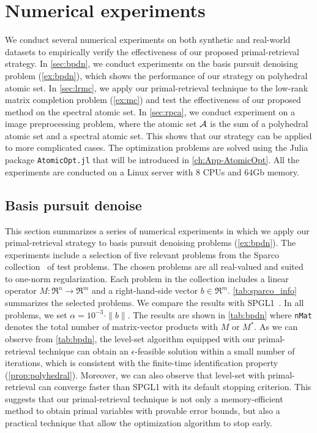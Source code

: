\section{Numerical experiments}

We conduct several numerical experiments on both synthetic and real-world datasets to empirically verify the effectiveness of our proposed primal-retrieval strategy. In \autoref{sec:bpdn}, we conduct experiments on the basis pursuit denoising problem (\autoref{ex:bpdn}), which shows the performance of our strategy on polyhedral atomic set. In \autoref{sec:lrmc}, we apply our primal-retrieval technique to the low-rank matrix completion problem (\autoref{ex:mc}) and test the effectiveness of our proposed method on the spectral atomic set. In \autoref{sec:rpca}, we conduct experiment on 
a image preprocessing problem, where the atomic set $\mathcal{A}$ is the sum of a polyhedral atomic set and a spectral atomic set. This shows that our strategy can be applied to more complicated cases. The optimization problems are solved using the Julia package \texttt{AtomicOpt.jl} that will be introduced in \autoref{ch:App-AtomicOpt}. All the experiments are conducted on a Linux server with 8 CPUs and 64Gb memory.

\subsection{Basis pursuit denoise} \label{sec:bpdn}

This section summarizes a series of numerical experiments in which we apply our primal-retrieval strategy to basis pursuit denoising problems (\autoref{ex:bpdn}). The experiments include a selection of five relevant problems from the Sparco collection~\cite{BergFrieHennHerrSaabYilm:2008} of test problems. The chosen problems are all real-valued and suited to one-norm regularization. Each problem in the collection includes a linear operator $M:\Re^n \to \Re^m$ and a right-hand-side vector $b \in \Re^m$. \autoref{tab:sparco_info} summarizes the selected problems. We compare the results with SPGL1~\cite{BergFriedlander:2008}. In all problems, we set $\alpha = 10^{-3}\cdot\|b\|$. The results are shown in \autoref{tab:bpdn} where \texttt{nMat} denotes the total number of matrix-vector products with $M$ or $M^*$. 
As we can observe from \autoref{tab:bpdn}, the level-set algorithm equipped with our primal-retrieval technique can obtain an $\epsilon$-feasible solution within a small number of iterations, which is consistent with the finite-time identification property (\autoref{prop:polyhedral}). Moreover, we can also observe that level-set with primal-retrieval can converge faster than SPGL1 with its default stopping criterion. This suggests that our primal-retrieval technique is not only a memory-efficient method to obtain primal variables with provable error bounds, but also a practical technique that allow the optimization algorithm to stop early.

